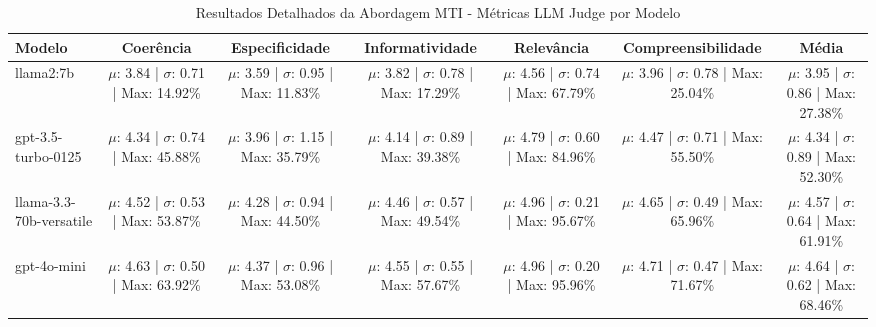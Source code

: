 \begin{table}[htbp]
\caption{Resultados Detalhados da Abordagem MTI - Métricas LLM Judge por Modelo}
\label{tab:mti_llm_judge}
\centering

\begin{adjustbox}{max width=\textwidth}
\begin{tabular}{lcccccc}
\toprule
Modelo & Coerência & Especificidade & Informatividade & Relevância & Compreensibilidade & Média \\
\midrule
llama2:7b & $\mu$: 3.84 | $\sigma$: 0.71 | Max: 14.92\% & $\mu$: 3.59 | $\sigma$: 0.95 | Max: 11.83\% & $\mu$: 3.82 | $\sigma$: 0.78 | Max: 17.29\% & $\mu$: 4.56 | $\sigma$: 0.74 | Max: 67.79\% & $\mu$: 3.96 | $\sigma$: 0.78 | Max: 25.04\% & $\mu$: 3.95 | $\sigma$: 0.86 | Max: 27.38\% \\
gpt-3.5-turbo-0125 & $\mu$: 4.34 | $\sigma$: 0.74 | Max: 45.88\% & $\mu$: 3.96 | $\sigma$: 1.15 | Max: 35.79\% & $\mu$: 4.14 | $\sigma$: 0.89 | Max: 39.38\% & $\mu$: 4.79 | $\sigma$: 0.60 | Max: 84.96\% & $\mu$: 4.47 | $\sigma$: 0.71 | Max: 55.50\% & $\mu$: 4.34 | $\sigma$: 0.89 | Max: 52.30\% \\
llama-3.3-70b-versatile & $\mu$: 4.52 | $\sigma$: 0.53 | Max: 53.87\% & $\mu$: 4.28 | $\sigma$: 0.94 | Max: 44.50\% & $\mu$: 4.46 | $\sigma$: 0.57 | Max: 49.54\% & $\mu$: 4.96 | $\sigma$: 0.21 | Max: 95.67\% & $\mu$: 4.65 | $\sigma$: 0.49 | Max: 65.96\% & $\mu$: 4.57 | $\sigma$: 0.64 | Max: 61.91\% \\
gpt-4o-mini & $\mu$: 4.63 | $\sigma$: 0.50 | Max: 63.92\% & $\mu$: 4.37 | $\sigma$: 0.96 | Max: 53.08\% & $\mu$: 4.55 | $\sigma$: 0.55 | Max: 57.67\% & $\mu$: 4.96 | $\sigma$: 0.20 | Max: 95.96\% & $\mu$: 4.71 | $\sigma$: 0.47 | Max: 71.67\% & $\mu$: 4.64 | $\sigma$: 0.62 | Max: 68.46\% \\
\bottomrule
\end{tabular}
\end{adjustbox}

\end{table}
